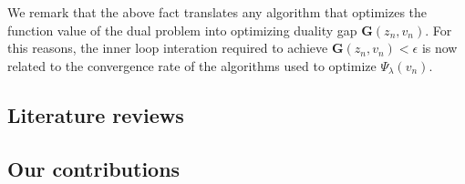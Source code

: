 \documentclass[12pt]{article}
\begin{document}
        We remark that the above fact translates any algorithm that optimizes the function value of the dual problem into optimizing duality gap $\mathbf G(z_n, v_n)$. 
        For this reasons, the inner loop interation required to achieve $\mathbf G(z_n, v_n) < \epsilon$ is now related to the convergence rate of the algorithms used to optimize $\Psi_\lambda(v_n)$. 
    \subsection{Literature reviews}

    \subsection{Our contributions}
\end{document}
